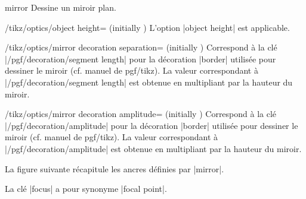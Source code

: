 \documentclass[a4paper]{ltxdoc}
\begin{document}
\begin{shape}{mirror}
Dessine un miroir plan.

\begin{codeexample}[width=6cm]
\end{codeexample}

\begin{key}{/tikz/optics/object height= (initially )}
    L'option |object height| est applicable.
\end{key}

\begin{key}{/tikz/optics/mirror decoration separation= (initially )}
Correspond à la clé |/pgf/decoration/segment length| pour la décoration |border| utilisée pour dessiner le miroir (cf. manuel de pgf/tikz). 
La valeur correspondant à |/pgf/decoration/segment length| est obtenue en multipliant  par la hauteur du miroir.
\end{key}

\begin{key}{/tikz/optics/mirror decoration amplitude= (initially )}
Correspond à la clé |/pgf/decoration/amplitude| pour la décoration |border| utilisée pour dessiner le miroir (cf. manuel de pgf/tikz).
La valeur correspondant à |/pgf/decoration/amplitude| est obtenue en multipliant  par la hauteur du miroir.
\end{key}


La figure suivante récapitule les ancres définies par |mirror|.

\begin{codeexample}[]
\Huge
{}
\end{codeexample}

La clé |focus| a pour synonyme |focal point|.

\end{shape}
\end{document}
